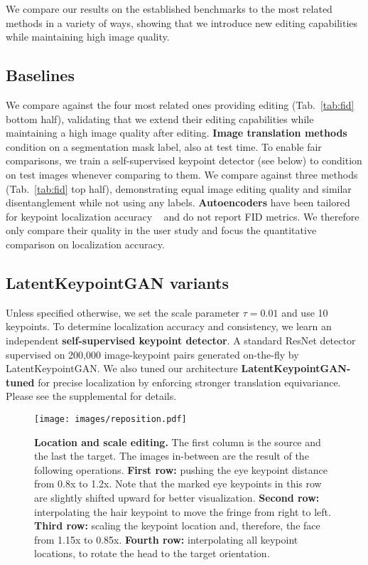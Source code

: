 \documentclass[10pt, conference, compsocconf]{IEEEtran}
\begin{document}
We compare our results on the established benchmarks to the most related methods in a variety of ways, showing that we introduce new editing capabilities while maintaining high image quality.

\subsection{Baselines}
We compare against the four most related ones providing editing (Tab.~\ref{tab:fid} bottom half), validating that we extend their editing capabilities while maintaining a high image quality after editing.
\textbf{Image translation methods} condition on a segmentation mask label, also at test time. To enable fair comparisons, we train a self-supervised keypoint detector (see below) to condition on test images whenever comparing to them. We compare against three methods (Tab.~\ref{tab:fid} top half), demonstrating equal image editing quality and similar disentanglement while not using any labels.
\textbf{Autoencoders} have been tailored for keypoint localization accuracy ~\cite{zhang2018unsupervised} and do not report FID metrics. We therefore only compare their quality in the user study and focus the quantitative comparison on localization accuracy.

\subsection{LatentKeypointGAN variants}
Unless specified otherwise, we set the scale parameter $\tau=0.01$ and use 10 keypoints. To determine localization accuracy and consistency, we learn an independent \textbf{self-supervised keypoint detector}. A standard ResNet detector \cite{xiao2018simple} supervised on 200,000 image-keypoint pairs generated on-the-fly by LatentKeypointGAN. We also tuned our architecture \textbf{LatentKeypointGAN-tuned} for precise localization by enforcing stronger translation equivariance. Please see the supplemental for details.








\begin{figure}[t]
\begin{center}
  \texttt{[image: images/reposition.pdf]}
  \vspace{-10pt}
\end{center}
  \caption{\textbf{Location and scale editing.} The first column is the source and the last the target. The images in-between are the result of the following operations.
  \textbf{First row:} pushing the eye keypoint distance from 0.8x to 1.2x. Note that the marked eye keypoints in this row are slightly shifted upward for better visualization.
  \textbf{Second row:} interpolating the hair keypoint to move the fringe from right to left. 
  \textbf{Third row:} scaling the keypoint location and, therefore, the face from 1.15x to 0.85x.
  \textbf{Fourth row:} interpolating all keypoint locations, to rotate the head to the target orientation. 
  }
\label{fig:reposition}
\end{figure}
\end{document}

